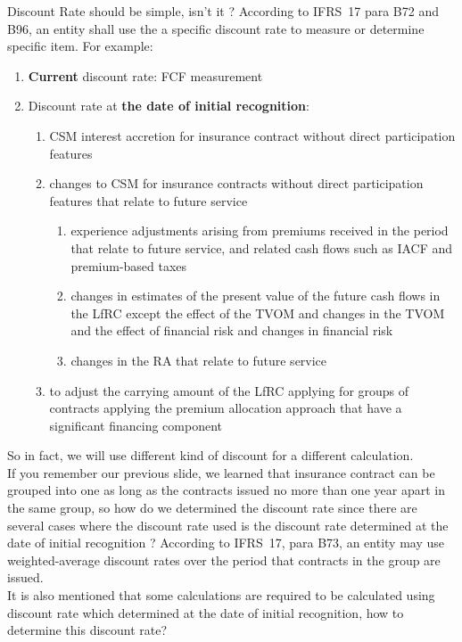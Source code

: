 \documentclass[aspectratio=169]{beamer}
\begin{document}
\begin{frame}[allowframebreaks]{Discount Rate should be simple, isn't it ?}
According to IFRS~17 para B72 and B96, an entity shall use the a specific discount rate to measure or determine specific item. For example: 
\begin{enumerate}
	\item \textbf{Current} discount rate: FCF measurement
	\item Discount rate at \textbf{the date of initial recognition}:
	\begin{enumerate}
		\item CSM interest accretion for insurance contract without direct participation features
		\item changes to CSM for insurance contracts without direct participation features that relate to future service
		\begin{enumerate}
			\item experience adjustments arising from premiums received in the period that relate to future service, and related cash flows such as IACF and premium-based taxes
			\item changes in estimates of the present value of the future cash flows in the LfRC except the effect of the TVOM and changes in the TVOM and the effect of financial risk and changes in financial risk
			\item changes in the RA that relate to future service
		\end{enumerate} 
	\item to adjust the carrying amount of the LfRC applying for groups of contracts applying the premium allocation approach that have a significant financing component
	\end{enumerate}
\end{enumerate}
So in fact, we will use different kind of discount for a different calculation. \\
If you remember our previous slide, we learned that insurance contract can be grouped into one as long as the contracts issued no more than one year apart in the same group, so how do we determined the discount rate since there are several cases where the discount rate used is the discount rate determined at the date of initial recognition ? According to IFRS~17, para B73, an entity may use weighted-average discount rates over the period that contracts in the group are issued.\\
It is also mentioned that some calculations are required to be calculated using discount rate which determined at the date of initial recognition, how to determine this discount rate?
\end{frame} 
\end{document}
